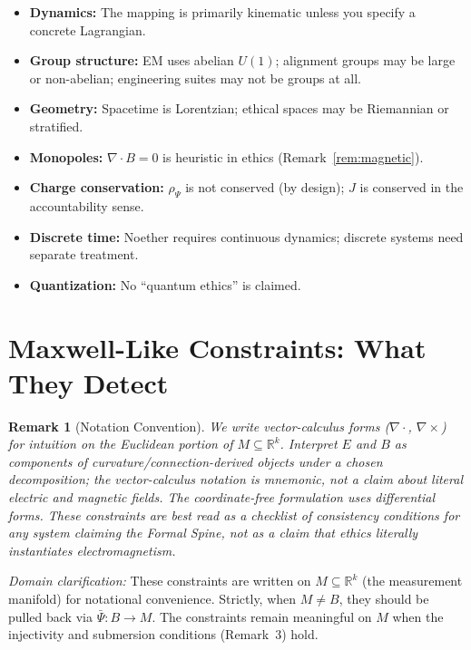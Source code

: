 \documentclass[12pt]{article}
\newtheorem{remark}[theorem]{Remark}
\begin{document}
\begin{itemize}
\item \textbf{Dynamics:} The mapping is primarily kinematic unless you specify a concrete Lagrangian.
\item \textbf{Group structure:} EM uses abelian $U(1)$; alignment groups may be large or non-abelian;
engineering suites may not be groups at all.
\item \textbf{Geometry:} Spacetime is Lorentzian; ethical spaces may be Riemannian or stratified.
\item \textbf{Monopoles:} $\nabla \cdot B = 0$ is heuristic in ethics (Remark~\ref{rem:magnetic}).
\item \textbf{Charge conservation:} $\rho_\Psi$ is not conserved (by design); $J$ is conserved in the accountability
sense.
\item \textbf{Discrete time:} Noether requires continuous dynamics; discrete systems need separate treatment.
\item \textbf{Quantization:} No ``quantum ethics'' is claimed.
\end{itemize}

\section{Maxwell-Like Constraints: What They Detect}

\begin{remark}[Notation Convention]
\emph{We write vector-calculus forms ($\nabla\cdot$, $\nabla\times$) for intuition on the
Euclidean portion of $M \subseteq \mathbb{R}^k$. Interpret $E$ and $B$ as components of curvature/connection-derived
objects under a chosen decomposition; the vector-calculus notation is mnemonic, not a claim about
literal electric and magnetic fields. The coordinate-free formulation uses differential forms. These
constraints are best read as a checklist of consistency conditions for any system claiming the Formal
Spine, not as a claim that ethics literally instantiates electromagnetism.}
\end{remark}

\emph{Domain clarification:} These constraints are written on $M \subseteq \mathbb{R}^k$ (the measurement manifold)
for notational convenience. Strictly, when $M \neq B$, they should be pulled back via $\bar{\Psi} : B \to M$. The
constraints remain meaningful on $M$ when the injectivity and submersion conditions (Remark~3)
hold.
\end{document}
